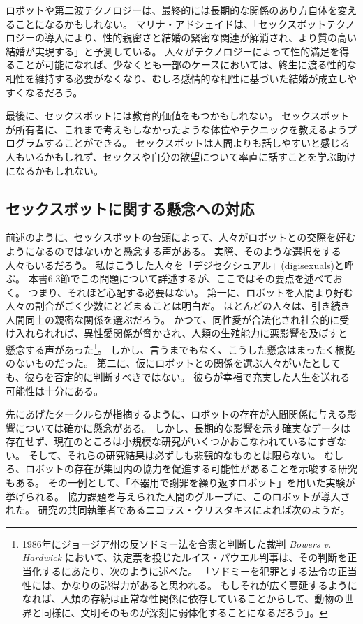 \documentclass[paper=a4,book,openany]{jlreq}
\begin{document}
ロボットや第二波テクノロジーは、最終的には長期的な関係のあり方自体を変えることになるかもしれない。
マリナ・アドシェイドは、「セックスボットテクノロジーの導入により、性的親密さと結婚の緊密な関連が解消され、より質の高い結婚が実現する」と予測している\citep[p.292]{adshade17:_sexbot_induc_social_chang}。
人々がテクノロジーによって性的満足を得ることが可能になれば、少なくとも一部のケースにおいては、終生に渡る性的な相性を維持する必要がなくなり、むしろ感情的な相性に基づいた結婚が成立しやすくなるだろう。

最後に、セックスボットには教育的価値をもつかもしれない。
セックスボットが所有者に、これまで考えもしなかったような体位やテクニックを教えるようプログラムすることができる。
セックスボットは人間よりも話しやすいと感じる人もいるかもしれず、セックスや自分の欲望について率直に話すことを学ぶ助けになるかもしれない。

\subsection{セックスボットに関する懸念への対応}

前述のように、セックスボットの台頭によって、人々がロボットとの交際を好むようになるのではないかと懸念する声がある。
実際、そのような選択をする人々もいるだろう。
私はこうした人々を「デジセクシュアル」(digisexuals)と呼ぶ。
本書6.3節でこの問題について詳述するが、ここではその要点を述べておく。
つまり、それほど心配する必要はない。
第一に、ロボットを人間より好む人々の割合がごく少数にとどまることは明白だ。
ほとんどの人々は、引き続き人間同士の親密な関係を選ぶだろう。
かつて、同性愛が合法化され社会的に受け入れられれば、異性愛関係が脅かされ、人類の生殖能力に悪影響を及ぼすと懸念する声があった\footnote{ 1986年にジョージア州の反ソドミー法を合憲と判断した裁判 \emph{Bowers v. Hardwick} において、決定票を投じたルイス・パウエル判事は、その判断を正当化するにあたり、次のように述べた。
「ソドミーを犯罪とする法令の正当性には、かなりの説得力があると思われる。
もしそれが広く蔓延するようになれば、人類の存続は正常な性関係に依存していることからして、動物の世界と同様に、文明そのものが深刻に弱体化することになるだろう」。}。
しかし、言うまでもなく、こうした懸念はまったく根拠のないものだった。
第二に、仮にロボットとの関係を選ぶ人々がいたとしても、彼らを否定的に判断すべきではない。
彼らが幸福で充実した人生を送れる可能性は十分にある。

先にあげたタークルらが指摘するように、ロボットの存在が人間関係に与える影響については確かに懸念がある。
しかし、長期的な影響を示す確実なデータは存在せず、現在のところは小規模な研究がいくつかおこなわれているにすぎない。
そして、それらの研究結果は必ずしも悲観的なものとは限らない。
むしろ、ロボットの存在が集団内の協力を促進する可能性があることを示唆する研究もある\citep{traeger20:_vulner_robot_posit_shape_human}。
その一例として、「不器用で謝罪を繰り返すロボット」を用いた実験が挙げられる。
協力課題を与えられた人間のグループに、このロボットが導入された。
研究の共同執筆者であるニコラス・クリスタキスによれば次のようだ。
\end{document}
